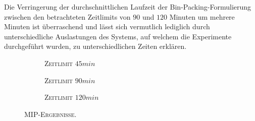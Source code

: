 Die Verringerung der durchschnittlichen Laufzeit der Bin-Packing-Formulierung zwischen den betrachteten
Zeitlimits von $90$ und $120$ Minuten um mehrere Minuten ist überraschend und lässt sich vermutlich
lediglich durch unterschiedliche Auslastungen des Systems, auf welchem die Experimente durchgeführt wurden,
zu unterschiedlichen Zeiten erklären.

\begin{figure}[H]
\begin{subfigure}[b]{0.3\textwidth}
\centering
{}
\caption{\textsc{Zeitlimit} $45min$}
\label{fig:mip_results_b=3_l_a}
\end{subfigure}
\begin{subfigure}[b]{0.3\textwidth}
\centering
{}
\caption{\textsc{Zeitlimit} $90min$}
\label{fig:mip_results_b=3_l_b}
\end{subfigure}
\begin{subfigure}[b]{0.3\textwidth}
\centering
{}
\caption{\textsc{Zeitlimit} $120min$}
\label{fig:mip_results_b=3_l_c}
\end{subfigure}
\caption{\textsc{MIP-Ergebnisse.}}
\label{}
\end{figure}

